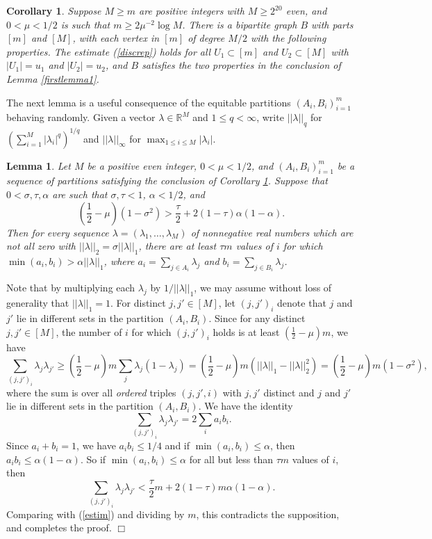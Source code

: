\documentclass[11pt]{article}
\newtheorem{lemma}{Lemma}[section]
\newtheorem{corollary}{Corollary}[section]
\newenvironment{proof}
      {\medskip\noindent{\bf Proof:}\hspace{1mm}}
      {\hfill$\Box$\medskip}
\begin{document}
\begin{corollary}\label{firstcor} Suppose $M \geq m$ are positive integers
with $M \geq 2^{20}$ even, and $0<\mu<1/2$ is such that $m \geq 2\mu^{-2}\log M$. There is
a bipartite graph $B$ with parts $[m]$ and $[M]$, with each vertex in $[m]$ of
degree $M/2$ with the following properties. The estimate  (\ref{discrep}) holds
for all $U_1 \subset [m]$ and $U_2 \subset [M]$ with $|U_1|=u_1$ and
$|U_2|=u_2$, and $B$ satisfies the two properties in the conclusion of Lemma
\ref{firstlemma1}.
\end{corollary}

The next lemma is a useful consequence of the equitable partitions
$(A_i,B_i)_{i=1}^{m}$ behaving randomly. Given a vector $\lambda \in \mathbb{R}^M$ and $1 \leq q < \infty$, write $||\lambda||_q$ for $\left(\sum_{i=1}^M |\lambda_i|^q\right)^{1/q}$ and $||\lambda||_{\infty}$ for $\max_{1 \leq i \leq M} |\lambda_i|$.

\begin{lemma}\label{quiteuseful}
Let $M$ be a positive even integer, $0<\mu<1/2$, and $(A_i,B_i)_{i=1}^m$ be a
sequence of partitions satisfying the conclusion of Corollary \ref{firstcor}.
Suppose
that $0<\sigma,\tau,\alpha$ are such that $\sigma,\tau<1$, $\alpha<1/2$, and
$$(\frac{1}{2}-\mu)(1-\sigma^2)>\frac{\tau}{2}+2(1-\tau)\alpha(1-\alpha).$$ Then
for every sequence $\lambda=(\lambda_1,\ldots,\lambda_M)$ of nonnegative real
numbers which are not all zero with $||\lambda||_2=\sigma||\lambda||_1$, there
are at least
$\tau m$ values of $i$ for which
$\min(a_i,b_i)>\alpha||\lambda||_1$, where $a_i=\sum_{j \in A_i}\lambda_j$ and
$b_i=\sum_{j
\in B_i}\lambda_j$.
\end{lemma}
\begin{proof}
Note that by multiplying each $\lambda_j$ by $1/||\lambda||_1$, we may assume
without loss of generality that $||\lambda||_1=1$.
For distinct $j,j' \in [M]$, let $(j,j')_i$ denote that $j$ and $j'$ lie in
different sets in the partition $(A_i,B_i)$.
Since for any distinct $j,j' \in [M]$, the number of $i$ for which $(j,j')_i$
holds is at least $(\frac{1}{2} - \mu) m$, we have
\begin{equation}\label{estim}\sum_{(j,j')_i}\lambda_j\lambda_{j'} \geq
(\frac{1}{2}-\mu) m\sum_j \lambda_j(1-\lambda_j) =(\frac{1}{2}-\mu)
m(||\lambda||_1-||\lambda||_2^2)=(\frac{1}{2}-\mu) m (1-\sigma^2),\end{equation}
where the sum is over all {\it ordered} triples $(j,j',i)$ with $j,j'$ distinct
and $j$ and $j'$ lie in different sets in the partition $(A_i,B_i)$.
We have the identity
$$\sum_{(j,j')_i}\lambda_j\lambda_{j'}=2\sum_i a_ib_i.$$
Since $a_i+b_i=1$, we have $a_ib_i \leq 1/4$ and if $\min(a_i,b_i) \leq
\alpha$, then $a_ib_i \leq \alpha(1-\alpha)$.
So if $\min(a_i,b_i) \leq \alpha$ for all but less than $\tau m$ values of $i$,
then
$$\sum_{(j,j')_i}\lambda_j\lambda_{j'} < \frac{\tau}{2} m
+2(1-\tau)m\alpha(1-\alpha).$$
Comparing with (\ref{estim}) and dividing by $m$, this contradicts the
supposition, and completes the proof.
\end{proof}
\end{document}
